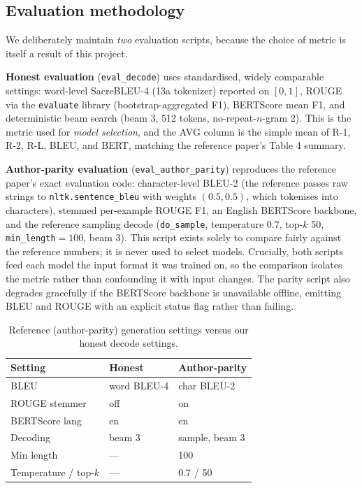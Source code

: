 \documentclass[11pt,twocolumn]{article}
\newcommand{\bt}[1]{\texttt{#1}}
\begin{document}
\subsection{Evaluation methodology}
\label{sec:evalmethod}
We deliberately maintain \emph{two} evaluation scripts, because the choice of metric is itself a
result of this project.

\textbf{Honest evaluation} (\bt{eval\_decode}) uses standardised, widely comparable settings:
word-level SacreBLEU-4 (13a tokenizer) reported on $[0,1]$, ROUGE via the \bt{evaluate} library
(bootstrap-aggregated F1), BERTScore mean F1, and deterministic beam search (beam 3, 512 tokens,
no-repeat-$n$-gram 2). This is the metric used for \emph{model selection}, and the AVG column is
the simple mean of R-1, R-2, R-L, BLEU, and BERT, matching the reference paper's Table 4 summary.

\textbf{Author-parity evaluation} (\bt{eval\_author\_parity}) reproduces the reference paper's
exact evaluation code: character-level BLEU-2 (the reference passes raw strings to
\bt{nltk.sentence\_bleu} with weights $(0.5,0.5)$, which tokenises into characters), stemmed
per-example ROUGE F1, an English BERTScore backbone, and the reference sampling decode
(\bt{do\_sample}, temperature 0.7, top-$k$ 50, \bt{min\_length}$=100$, beam 3). This script exists
solely to compare fairly against the reference numbers; it is never used to select models.
Crucially, both scripts feed each model the input format it was trained on, so the comparison
isolates the metric rather than confounding it with input changes. The parity script also degrades
gracefully if the BERTScore backbone is unavailable offline, emitting BLEU and ROUGE with an
explicit status flag rather than failing.

\begin{table}[t]
\centering
\caption{Reference (author-parity) generation settings versus our honest decode settings.}
\label{tab:decode}
\small
\begin{tabular}{lll}
\toprule
Setting & Honest & Author-parity \\
\midrule
BLEU & word BLEU-4 & char BLEU-2 \\
ROUGE stemmer & off & on \\
BERTScore lang & en & en \\
Decoding & beam 3 & sample, beam 3 \\
Min length & --- & 100 \\
Temperature / top-$k$ & --- & 0.7 / 50 \\
\bottomrule
\end{tabular}
\end{table}
\end{document}
